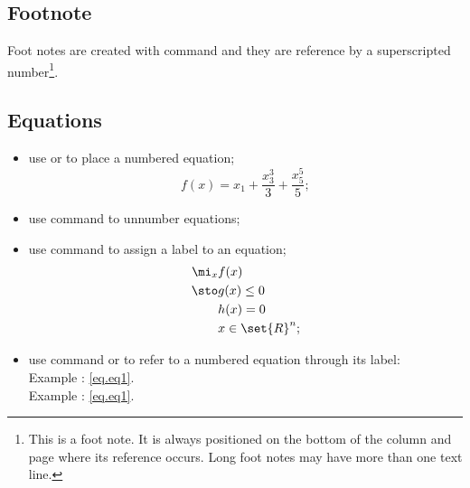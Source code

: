 \documentclass[report,english]{enacom}
\begin{document}
\subsection{Footnote}
	Foot notes are created with command  and they are reference by a superscripted number\footnote{This is a foot note. It is always positioned on the bottom of the column and page where its reference occurs. Long foot notes may have more than one text line.}.


\subsection{Equations}
    \begin{itemize}
        \item use  or  to place a numbered equation;
        \begin{equation}\label{eq.Series}
            f(x) = x_1 + \frac{x_3^3}{3} + \frac{x_5^5}{5};
        \end{equation}		
        \item use command  to unnumber equations;
        \item use command  to assign a label to an equation;
        \begin{align}
            \mi_x & f(x)\label{eq.eq1}\\
        \sto & g(x) \leq 0\label{eq.eq2}\\
            & h(x) = 0\label{eq.eq3}\\
            & x \in \set{R}^n\label{eq.eq4};
        \end{align}
        \item use command  or  to refer to a numbered equation through its label:\\
        Example : \eqref{eq.eq1}. \\
        Example : \autoref{eq.eq1}.  
    \end{itemize}
\end{document}
